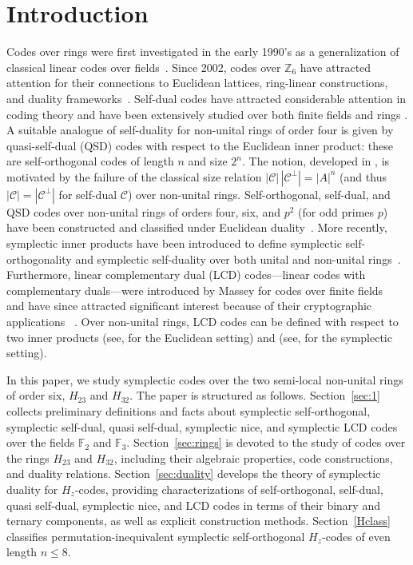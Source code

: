 \documentclass[11pt,a4paper]{article}
\theoremstyle{definition}
\numberwithin{equation}{section}
\newcommand{\F}{\mathbb{F}}
\def\C{{\mathcal{C}}}
\begin{document}
\section{Introduction}
Codes over rings were first investigated in the early 1990's as a generalization of classical linear codes over fields~\cite{ShiAlahmadiSole2017}. Since 2002, codes over \(\mathbb{Z}_6\) have attracted attention for their connections to Euclidean lattices, ring-linear constructions, and duality frameworks~\cite{Z61,Z62}. Self-dual codes have attracted considerable attention in coding theory and have been extensively studied over both finite fields and rings \cite{HuffmanKimSole2021,MacWilliamsSloane1977,NebeRainsSloane2006,PlessBrualdiHuffman1998}. A suitable analogue of self-duality for non-unital rings of order four is given by quasi-self-dual (QSD) codes with respect to the Euclidean inner product: these are self-orthogonal codes of length \(n\) and size \(2^n\). The notion, developed in \cite{Alahmadi2020,Alahmadi2021,Alahmadi2022}, is motivated by the failure of the classical size relation \(|\C|\,|\C^\perp|=|A|^n\) (and thus \(|\C|=|\C^\perp|\) for self-dual \(\C\)) over non-unital rings.  Self-orthogonal, self-dual, and QSD codes over non-unital rings of orders four, six, and \(p^2\) (for odd primes \(p\)) have been constructed and classified under Euclidean duality~\cite{Altaf,AAABBSS,AE,A1,A2,A3}. More recently,  symplectic inner products have been introduced to define symplectic self-orthogonality and symplectic self-duality over both unital and non-unital rings~\cite{sara1,sara2}. Furthermore, linear complementary dual (LCD) codes—linear codes with complementary duals—were introduced by Massey for codes over finite fields ~\cite{SLCD} and have since attracted significant interest because of their cryptographic applications ~\cite{CarletGuilley2016}. Over non-unital rings, LCD codes can be defined with respect to two inner products (see,  \cite{SLCD,Melaibari.A et al.} for the Euclidean setting) and  (see,  \cite{sara1} for the symplectic setting).





In this paper, we study symplectic codes over the two semi-local non-unital rings of order six, \(H_{23}\) and \(H_{32}\). The paper is structured as follows. Section~\ref{sec:1} collects preliminary definitions and facts about symplectic self-orthogonal, symplectic self-dual, quasi self-dual, symplectic nice, and symplectic LCD codes over the fields \(\F_2\) and \(\F_3\). Section~\ref{sec:rings} is devoted to the study of codes over the rings \(H_{23}\) and \(H_{32}\), including their algebraic properties, code constructions, and duality relations. Section~\ref{sec:duality} develops the theory of symplectic duality for \(H_z\)-codes, providing characterizations of self-orthogonal, self-dual, quasi self-dual, symplectic nice, and LCD codes in terms of their binary and ternary components, as well as explicit construction methods.  Section~\ref{Hclass} classifies permutation-inequivalent symplectic self-orthogonal \(H_z\)-codes of even length \(n\le 8\). 
\end{document}
